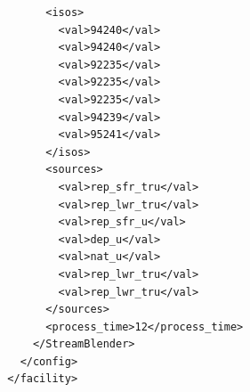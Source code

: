 \begin{frame}[fragile]
\footnotesize{
\begin{lstlisting}
        <isos>
          <val>94240</val>
          <val>94240</val>
          <val>92235</val>
          <val>92235</val>
          <val>92235</val>
          <val>94239</val>
          <val>95241</val>
        </isos>
        <sources>
          <val>rep_sfr_tru</val>
          <val>rep_lwr_tru</val>
          <val>rep_sfr_u</val>
          <val>dep_u</val>
          <val>nat_u</val>
          <val>rep_lwr_tru</val>
          <val>rep_lwr_tru</val>
        </sources>
        <process_time>12</process_time>
      </StreamBlender>
    </config>
  </facility>
\end{lstlisting}
}
\end{frame}

